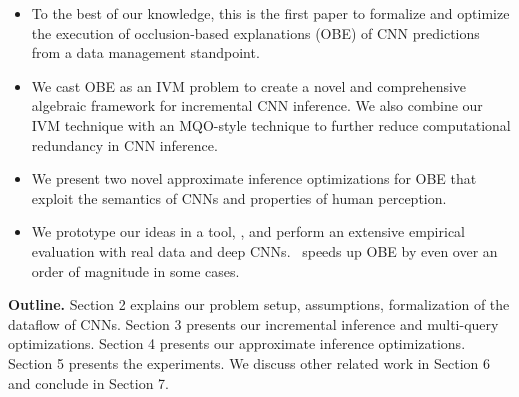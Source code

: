 \vspace{-2.5mm}
\begin{itemize}
	\item To the best of our knowledge, this is the first paper to formalize and optimize the execution of occlusion-based explanations (OBE) of CNN predictions from a data management standpoint.

	\item We cast OBE as an IVM problem to create a novel and comprehensive algebraic framework for incremental CNN inference. We also combine our IVM technique with an MQO-style technique to further reduce computational redundancy in CNN inference.

	\item We present two novel approximate inference optimizations for OBE that exploit the semantics of CNNs and properties of human perception.

	\item We prototype our ideas in a tool, \system, and perform an extensive empirical evaluation with real data and deep CNNs. \system ~speeds up OBE by even over an order of magnitude in some cases.

\end{itemize}

\vspace{-2.5mm}
\noindent \textbf{Outline.} 
Section 2 explains our problem setup, assumptions, formalization of the dataflow of CNNs. Section 3 presents our incremental inference and multi-query optimizations. Section 4 presents our approximate inference optimizations. Section 5 presents the experiments. We discuss other related work in Section 6 and conclude in Section 7.
